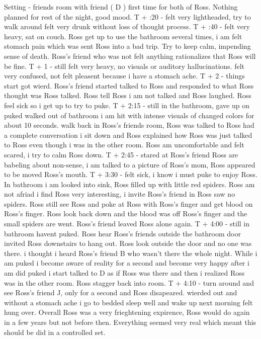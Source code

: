 \documentclass[12pt]{book}
\begin{document}
Setting - friends room with friend ( D ) first time for both of Ross. Nothing planned for rest of the night, good mood. T + :20 - felt very lightheaded, try to walk around felt very drunk without loss of thought process. T + :40 - felt very heavy, sat on couch. Ross get up to use the bathroom several times, i am felt stomach pain which was sent Ross into a bad trip. Try to keep calm, impending sense of death. Ross's friend who was not felt anything rationalizes that Ross will be fine. T + 1 - still felt very heavy, no visuals or auditory hallucinations. felt very confused, not felt pleasent because i have a stomach ache. T + 2 - things start got wierd. Ross's friend started talked to Ross and responded to what Ross thought was Ross talked. Ross tell Ross i am not talked and Ross laughed. Ross feel sick so i get up to try to puke. T + 2:15 - still in the bathroom, gave up on puked walked out of bathroom i am hit with intense visuals of changed colors for about 10 seconds. walk back in Ross's friends room, Ross was talked to Ross had a complete conversation i sit down and Ross explained how Ross was just talked to Ross even though i was in the other room. Ross am uncomfortable and felt scared, i try to calm Ross down. T + 2:45 - stared at Ross's friend Ross are babeling about non-sense, i am talked to a picture of Ross's mom, Ross appeared to be moved Ross's mouth. T + 3:30 - felt sick, i know i must puke to enjoy Ross. In bathroom i am looked into sink, Ross filled up with little red spiders. Ross am not afriad i find Ross very interesting, i invite Ross's friend in Ross saw no spiders. Ross still see Ross and poke at Ross with Ross's finger and get blood on Ross's finger. Ross look back down and the blood was off Ross's finger and the small spiders are went. Ross's friend leaved Ross alone again. T + 4:00 - still in bathroom havent puked. Ross hear Ross's friends outside the bathroom door invited Ross downstairs to hang out. Ross look outside the door and no one was there. i thought i heard Ross's friend B who wasn't there the whole night. While i am puked i become aware of reality for a second and become very happy after i am did puked i start talked to D as if Ross was there and then i realized Ross was in the other room. Ross stagger back into room. T + 4:10 - turn around and see Ross's friend J, only for a second and Ross disapeared. wierded out and without a stomach ache i go to bedded sleep well and wake up next morning felt hung over. Overall Ross was a very frieghtening expirence, Ross would do again in a few years but not before then. Everything seemed very real which meant this should be did in a controlled set.
\end{document}
